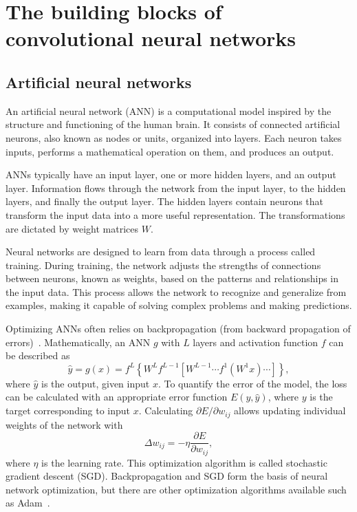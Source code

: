 \section[CNN building blocks]{The building blocks of convolutional neural networks}

\subsection{Artificial neural networks}
An artificial neural network (ANN) is a computational model inspired by the structure and functioning of the human brain.
It consists of connected artificial neurons, also known as nodes or units, organized into layers.
Each neuron takes inputs, performs a mathematical operation on them, and produces an output.

ANNs typically have an input layer, one or more hidden layers, and an output layer.
Information flows through the network from the input layer, to the hidden layers, and finally the output layer.
The hidden layers contain neurons that transform the input data into a more useful representation.
The transformations are dictated by weight matrices $W$.

Neural networks are designed to learn from data through a process called training.
During training, the network adjusts the strengths of connections between neurons, known as weights, based on the patterns and relationships in the input data.
This process allows the network to recognize and generalize from examples, making it capable of solving complex problems and making predictions.

Optimizing ANNs often relies on backpropagation (from backward propagation of errors)~\cite{Rumelhart1986}.
Mathematically, an ANN $g$ with $L$ layers and activation function $f$ can be described as
\begin{equation}
    \hat{y} = g(x) = f^L \left\{W^L f^{L-1} \left[W^{L-1} \cdots f^1 \left(W^1 x\right) \cdots \right] \right\},
\end{equation}
where $\hat{y}$ is the output, given input $x$.
To quantify the error of the model, the loss can be calculated with an appropriate error function $E(y, \hat{y})$, where $y$ is the target corresponding to input $x$.
Calculating $\partial E / \partial w_{ij}$ allows updating individual weights of the network with \eg
\begin{equation}
    \Delta w_{ij} = -\eta \frac{\partial E}{\partial w_{ij}},
\end{equation}
where $\eta$ is the learning rate.
This optimization algorithm is called stochastic gradient descent (SGD).
Backpropagation and SGD form the basis of neural network optimization, but there are other optimization algorithms available such as Adam~\cite{Kingma2014AdamAM}.

